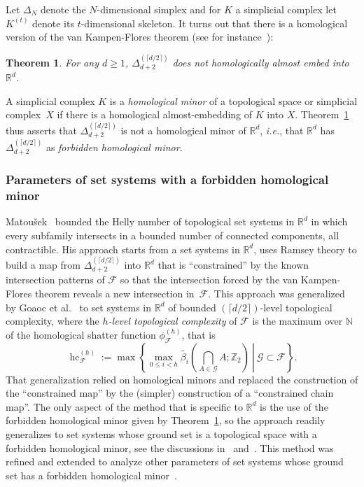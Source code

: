 \documentclass[11pt]{article}
\newcommand{\R}{\mathbb{R}}
\newcommand{\Z}{\mathbb{Z}}
\newcommand{\N}{\mathbb{N}}
\newcommand{\F}{\mathcal{F}}
\newcommand{\G}{\mathcal{G}}
\DeclareMathOperator{\hc}{hc}
\newcommand{\defn}[1]{\emph{\color{violet}#1}}
\newcommand{\pth}[1]{\left(#1\right)}
\newtheorem{theorem}{Theorem}
\begin{document}
%
\medskip
%
Let $\Delta_N$ denote the $N$-dimensional simplex and for $K$ a simplicial complex let $K^{(t)}$ denote its $t$-dimensional skeleton. It turns out that there is a homological version of the van Kampen-Flores theorem (see for instance~\cite[Corollary~14]{hellyBetti}):
%
\begin{theorem}
  \label{t:homological-vKF}
  For any $d \ge 1$, $\Delta_{d+2}^{(\lceil d/2 \rceil)}$ does not homologically almost embed into $\R^d$.
\end{theorem}
%
\noindent
A simplicial complex $K$ is a \defn{homological minor} of a topological space or simplicial complex~$X$ if there is a homological almost-embedding of $K$ into $X$. Theorem~\ref{t:homological-vKF} thus asserts that $\Delta_{d+2}^{(\lceil d/2 \rceil)}$ is not a homological minor of $\R^{d}$, \emph{i.e.}, that $\R^{d}$ has $\Delta_{d+2}^{(\lceil d/2 \rceil)}$ as \defn{forbidden homological minor}. 
%
%
\subsubsection{Parameters of set systems with a forbidden homological minor}
%
Matou\v sek~\cite{m-httucs-97} bounded the Helly number of topological set systems in $\R^d$ in which every subfamily intersects in a bounded number of connected components, all contractible. His approach starts from a set systems in $\R^d$, uses Ramsey theory to build a map from $\Delta_{d+2}^{(\lceil d/2 \rceil)}$  into $\R^d$ that is ``constrained'' by the known intersection patterns of $\F$ so that the intersection forced by the van Kampen-Flores theorem reveals a new intersection in~$\F$.
%
\medskip
%
This approach was generalized by Goaoc et al.~\cite{hellyBetti} to set systems in $\R^d$ of bounded $(\lceil d/2 \rceil)$-level topological complexity, where the \defn{$h$-level topological complexity} of $\F$ is the maximum over $\N$ of the homological shatter function $\phi_{\F}^{(h)}$, that is
%
\begin{equation}\label{eq:topcomp}
  \hc_\F^{(h)} := \max\left\{\max_{0 \le i < h}\left.\tilde{\beta_i}\pth{\bigcap\limits_{A\in \G} A;\Z_2} \ \right| \ \G\subset \F\right\}.
\end{equation}
%
\noindent
That generalization relied on homological minors and replaced the construction of the ``constrained map'' by the (simpler) construction of a ``constrained chain map''. The only aspect of the method that is specific to $\R^d$ is the use of the forbidden homological minor given by Theorem~\ref{t:homological-vKF}, so the approach readily generalizes to set systems whose ground set is a topological space with a forbidden homological minor, see the discussions in~\cite[$\mathsection 5.2$]{patakova2022bounding} and~\cite[$\mathsection 2.2$]{steppingUp}. This method was refined and extended to analyze other parameters of set systems whose ground set has a forbidden homological minor~\cite{patakova2022bounding,patak2025sharper,steppingUp}.
%
%
\end{document}
